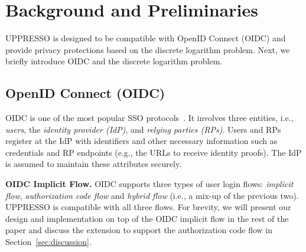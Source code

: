 \section{Background and Preliminaries}
\label{sec:background}
UPPRESSO is designed to be compatible with OpenID Connect (OIDC) and provide privacy protections based on the discrete logarithm problem. Next, we briefly introduce OIDC and the discrete logarithm problem.

\subsection{OpenID Connect (OIDC)}
\label{subsec:OIDC}
OIDC is one of the most popular SSO protocols~\cite{OpenIDConnect}. %
It involves three entities, i.e., {\em users}, the {\em identity provider (IdP)}, and {\em relying parties (RPs)}.
Users and RPs register at the IdP with identifiers %
and other necessary information such as credentials and RP endpoints (e.g., the URLs to receive identity proofs).
The IdP is assumed to maintain these attributes securely.

\noindent\textbf{OIDC Implicit Flow.}
OIDC supports three types of user login flows: {\em implicit flow}, {\em authorization code flow} and {\em hybrid flow} (i.e., a mix-up of the previous two).
UPPRESSO is compatible with all three flows. For brevity, we will present our design and implementation on top of the OIDC implicit flow in the rest of the paper and discuss the extension to support the authorization code flow in Section~\ref{sec:discussion}.

